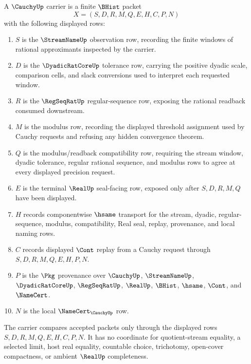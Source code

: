 \begin{definition}
\label{def:cauchy-carrier}
A $\CauchyUp$ carrier is a finite $\BHist$ packet
$$
X=(S,D,R,M,Q,E,H,C,P,N)
$$
with the following displayed rows:
\begin{enumerate}
\item $S$ is the $\StreamNameUp$ observation row, recording the finite windows of rational approximants inspected by the carrier.
\item $D$ is the $\DyadicRatCoreUp$ tolerance row, carrying the positive dyadic scale, comparison cells, and slack conversions used to interpret each requested window.
\item $R$ is the $\RegSeqRatUp$ regular-sequence row, exposing the rational readback consumed downstream.
\item $M$ is the modulus row, recording the displayed threshold assignment used by Cauchy requests and refusing any hidden convergence theorem.
\item $Q$ is the modulus/readback compatibility row, requiring the stream window, dyadic tolerance, regular rational sequence, and modulus rows to agree at every displayed precision request.
\item $E$ is the terminal $\RealUp$ seal-facing row, exposed only after $S,D,R,M,Q$ have been displayed.
\item $H$ records componentwise $\hsame$ transport for the stream, dyadic, regular-sequence, modulus, compatibility, Real seal, replay, provenance, and local naming rows.
\item $C$ records displayed $\Cont$ replay from a Cauchy request through $S,D,R,M,Q,E,H,P,N$.
\item $P$ is the $\Pkg$ provenance over $\CauchyUp$, $\StreamNameUp$, $\DyadicRatCoreUp$, $\RegSeqRatUp$, $\RealUp$, $\BHist$, $\hsame$, $\Cont$, and $\NameCert$.
\item $N$ is the local $\NameCert_{\CauchyUp}$ row.
\end{enumerate}
The carrier compares accepted packets only through the displayed rows $S,D,R,M,Q,E,H,C,P,N$. It has no coordinate for quotient-stream equality, a selected limit, host real equality, countable choice, trichotomy, open-cover compactness, or ambient $\RealUp$ completeness.
\end{definition}

